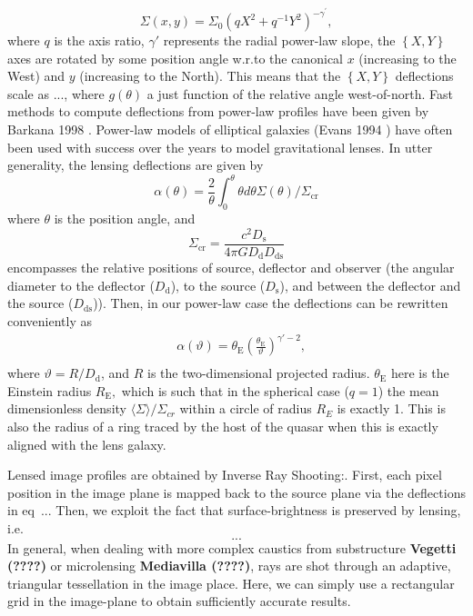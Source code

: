 \documentclass[a4paper,11pt]{article}
\begin{document}
\begin{equation}
\Sigma(x,y)=\Sigma_{0}(q X^{2}+q^{-1}Y^{2})^{-\gamma^{\prime}},
\end{equation}
where $q$ is the axis ratio, $\gamma'$ represents the radial power-law slope, the $\left\{X,Y\right\}$ axes are rotated by some position angle w.r.to the canonical $x$ (increasing to the West) and $y$ (increasing to the North). This means that the $\left\{X,Y\right\}$ deflections scale as ..., where $g(\theta)$ a just function of the relative angle west-of-north. Fast methods to compute deflections from power-law profiles have been given by Barkana 1998 \cite{1998ApJ...502..531B}. Power-law models of elliptical galaxies (Evans 1994 \cite{1994MNRAS.267..333E}) have often been used with success over the years to model gravitational lenses. In utter generality, the lensing deflections are given by
%
\begin{equation}
\alpha(\theta) = \frac{2}{\theta} \int_{0}^{\theta} \theta d\theta \Sigma (\theta) /\Sigma_{\mathrm{cr}}
\end{equation}
%
where $\theta$ is the position angle, and 
%
\begin{equation}
\Sigma_{\mathrm{cr}} = \frac{c^{2}D_{\mathrm{s}}}{4\pi G D_{\mathrm{d}} D_{\mathrm{ds}}}
\end{equation}
%
encompasses the relative positions of source, deflector and observer (the angular diameter to the deflector ($D_{\mathrm{d}}$), to the source ($D_{\mathrm{s}}$), and between the deflector and the source ($D_{\mathrm{ds}}$)). Then, in our power-law case the deflections can be rewritten conveniently as
%
\begin{eqnarray}
   \label{eq:Intensity}
   &\alpha(\vartheta) = \theta_{\mathrm{E}}\left(\frac{\theta_{\mathrm{E}}}{\vartheta}\right)^{\gamma'-2} ,\\  
\end{eqnarray}
%
where $\vartheta = R/D_{\mathrm{d}}$, and $R$ is the two-dimensional projected radius. $\theta_{\mathrm{E}}$ here is the Einstein radius $R_{\mathrm{E}},$ which is such that in the spherical case ($q=1$) the mean dimensionless density $\langle\Sigma\rangle/\Sigma_{cr}$ within a circle of radius $R_E$ is exactly 1. This is also the radius of a ring traced by the host of the quasar when this is exactly aligned with the lens galaxy.

Lensed image profiles are obtained by Inverse Ray Shooting:. First, each pixel position in the image plane is mapped back to the source plane via the deflections in eq~... Then, we exploit the fact that surface-brightness is preserved by lensing, i.e.
\begin{equation}
...
\end{equation}
In general, when dealing with more complex caustics from substructure \textbf{Vegetti (????)} or microlensing \textbf{Mediavilla (????)},
 rays are shot through an adaptive, triangular tessellation in the image place.
 Here, we can simply use a rectangular grid in the image-plane to obtain sufficiently accurate results.
\end{document}
